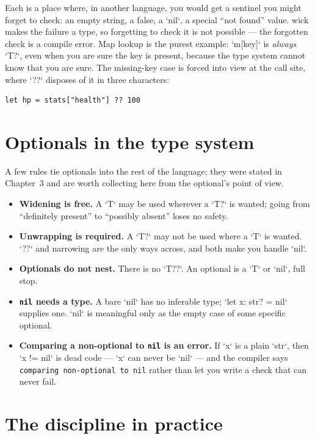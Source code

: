 \noindent
Each is a place where, in another language, you would get a sentinel you might
forget to check: an empty string, a false, a `nil`, a special ``not found''
value. wick makes the failure a type, so forgetting to check it is not
possible --- the forgotten check is a compile error. Map lookup is the purest
example: `m[key]` is \emph{always} `T?`, even when you are sure the key is
present, because the type system cannot know that you are sure. The missing-key
case is forced into view at the call site, where `??` disposes of it in three
characters:

\begin{lstlisting}[language=wick]
let hp = stats["health"] ?? 100
\end{lstlisting}

\section{Optionals in the type system}

A few rules tie optionals into the rest of the language; they were stated in
Chapter~3 and are worth collecting here from the optional's point of view.

\begin{itemize}
\item \textbf{Widening is free.} A `T` may be used wherever a `T?` is wanted;
going from ``definitely present'' to ``possibly absent'' loses no safety.
\item \textbf{Unwrapping is required.} A `T?` may not be used where a `T` is
wanted. `??` and narrowing are the only ways across, and both make you handle
`nil`.
\item \textbf{Optionals do not nest.} There is no `T??`. An optional is a `T`
or `nil`, full stop.
\item \textbf{\texttt{nil} needs a type.} A bare `nil` has no inferable type;
`let x: str? = nil` supplies one. `nil` is meaningful only as the empty case
of some specific optional.
\item \textbf{Comparing a non-optional to \texttt{nil} is an error.} If `x` is
a plain `str`, then `x != nil` is dead code --- `x` can never be `nil` --- and
the compiler says \texttt{comparing non-optional to nil} rather than let you
write a check that can never fail.
\end{itemize}

\section{The discipline in practice}

